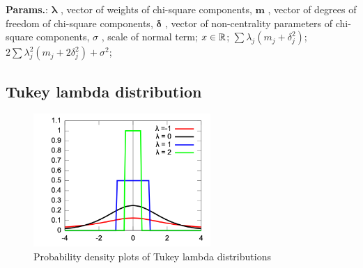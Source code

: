     {\color{darkblue} \textbf{Params.}:} {$\boldsymbol{\lambda}$ , vector of weights of chi-square components,  $\boldsymbol{m}$ , vector of degrees of freedom of chi-square components,  $\boldsymbol{\delta}$ , vector of non-centrality parameters of chi-square components,  $\sigma$ , scale of normal term}; {$x\in\mathbb{R}$}; {$\sum \lambda_j (m_j+\delta_j^2)$}; {$2 \sum \lambda_j^2 (m_j+2 \delta_j^2) + \sigma^2$};\hspace{0.5cm}\\



    
        
\subsection{Tukey lambda distribution}


    \begin{figure}[H]
        \centering
        \includegraphics[width=0.6\textwidth]{images/Several samples of the pdfs of the Tukey lambda distributions.png}
        \caption{Probability density plots of Tukey lambda distributions}
    \end{figure}




